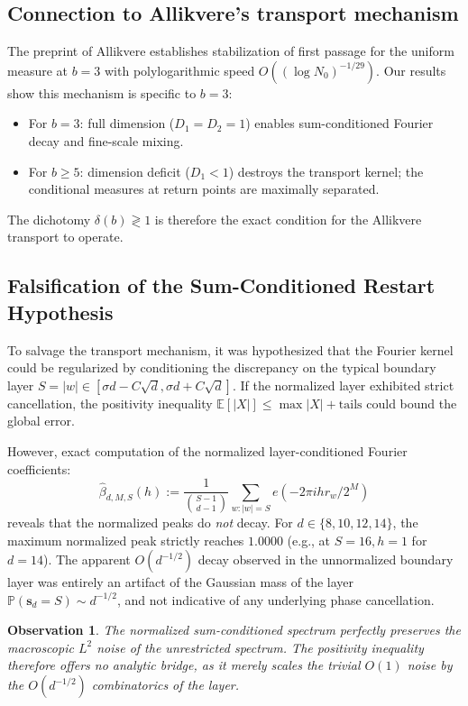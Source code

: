 \documentclass[12pt,a4paper]{article}
\newtheorem{observation}[theorem]{Observation}
\begin{document}
\subsection{Connection to Allikvere's transport mechanism}

The preprint of Allikvere establishes stabilization of first passage for the 
uniform measure at $b=3$ with polylogarithmic speed $O((\log N_0)^{-1/29})$. Our 
results show this mechanism is specific to $b=3$:

\begin{itemize}
\item For $b=3$: full dimension ($D_1 = D_2 = 1$) enables sum-conditioned 
Fourier decay and fine-scale mixing.
\item For $b \ge 5$: dimension deficit ($D_1 < 1$) destroys the transport 
kernel; the conditional measures at return points are maximally separated.
\end{itemize}

The dichotomy $\delta(b) \gtrless 1$ is therefore the exact condition for the 
Allikvere transport to operate.

\subsection{Falsification of the Sum-Conditioned Restart Hypothesis}

To salvage the transport mechanism, it was hypothesized that the Fourier kernel could be 
regularized by conditioning the discrepancy on the typical boundary layer 
$S = |w| \in [\sigma d - C\sqrt{d}, \sigma d + C\sqrt{d}]$. If the normalized layer 
exhibited strict cancellation, the positivity inequality $\mathbb{E}[|X|] \le \max|X| + \text{tails}$ 
could bound the global error.

However, exact computation of the normalized layer-conditioned Fourier coefficients:
\[
\widehat\beta_{d,M,S}(h) := \frac{1}{\binom{S-1}{d-1}} \sum_{w: |w|=S} e(-2\pi i h r_w/2^M)
\]
reveals that the normalized peaks do \emph{not} decay. For $d \in \{8, 10, 12, 14\}$, the maximum 
normalized peak strictly reaches $1.0000$ (e.g., at $S=16, h=1$ for $d=14$). 
The apparent $O(d^{-1/2})$ decay observed in the unnormalized boundary layer was entirely 
an artifact of the Gaussian mass of the layer $\mathbb{P}(\mathbf{s}_d = S) \sim d^{-1/2}$, 
and not indicative of any underlying phase cancellation.

\begin{observation}
The normalized sum-conditioned spectrum perfectly preserves the macroscopic $L^2$ noise 
of the unrestricted spectrum. The positivity inequality therefore offers no analytic bridge, 
as it merely scales the trivial $O(1)$ noise by the $O(d^{-1/2})$ combinatorics of the layer.
\end{observation}
\end{document}
